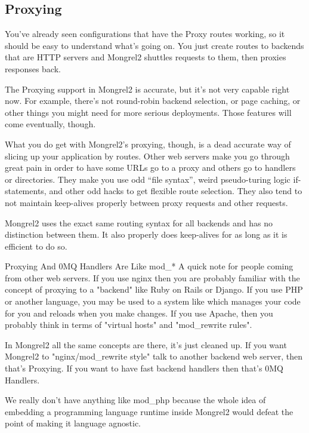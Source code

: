 \subsection{Proxying}

You've already seen configurations that have the Proxy routes working, so it should
be easy to understand what's going on.  You just create routes to backends that are
HTTP servers and Mongrel2 shuttles requests to them, then proxies responses back.

The Proxying support in Mongrel2 is accurate, but it's not very capable right now.  For
example, there's not round-robin backend selection, or page caching, or other things you
might need for more serious deployments.  Those features will come eventually, though.

What you do get with Mongrel2's proxying, though, is a dead accurate way of slicing up
your application by routes.  Other web servers make you go through great pain in order
to have some URLs go to a proxy and others go to handlers or directories.  They make you
use odd ``file syntax'', weird pseudo-turing logic if-statements, and other odd hacks
to get flexible route selection.  They also tend to not maintain keep-alives properly
between proxy requests and other requests.

Mongrel2 uses the exact same routing syntax for all backends and has no distinction between
them.  It also properly does keep-alives for as long as it is efficient to do so.

\begin{aside}{Proxying And 0MQ Handlers Are Like mod\_*}
A quick note for people coming from other web servers.  If you use nginx then you are probably
familiar with the concept of proxying to a "backend" like Ruby on Rails or Django.
If you use PHP or another language, you may be used to a system like  which 
manages your code for you and reloads when you make changes.
If you use Apache, then you probably think in terms of "virtual hosts" and "mod\_rewrite rules".

In Mongrel2 all the same concepts are there, it's just cleaned up.  If you want Mongrel2
to "nginx/mod\_rewrite style" talk to another backend web server, then that's Proxying.
If you want to have fast backend handlers then that's 0MQ Handlers.

We really don't have anything like mod\_php because the whole idea of embedding a programming
language runtime inside Mongrel2 would defeat the point of making it language agnostic.
\end{aside}

